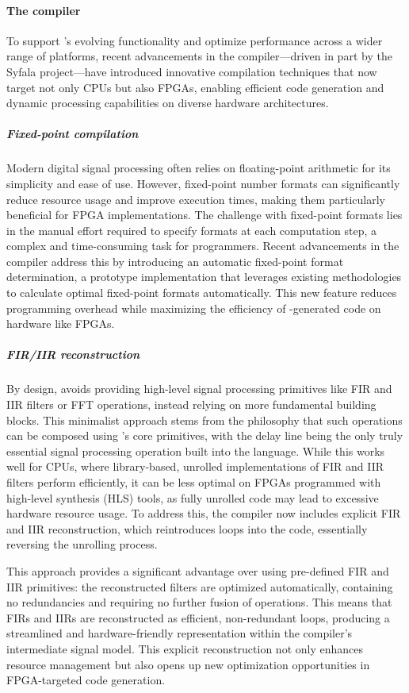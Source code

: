 \paragraph{The \F{} compiler}

To support \F{}'s evolving functionality and optimize performance
across a wider range of platforms, recent advancements in the \F{}
compiler---driven in part by the Syfala project---have introduced
innovative compilation techniques that now target not only CPUs but also
FPGAs, enabling efficient code generation and dynamic processing
capabilities on diverse hardware architectures.

\subparagraph{Fixed-point compilation}

Modern digital signal processing often relies on floating-point
arithmetic for its simplicity and ease of use. However, fixed-point
number formats can significantly reduce resource usage and improve
execution times, making them particularly beneficial for FPGA
implementations. The challenge with fixed-point formats lies in the
manual effort required to specify formats at each computation step, a
complex and time-consuming task for programmers. Recent advancements in
the \F{} compiler address this by introducing an automatic fixed-point
format determination, a prototype implementation that leverages existing
methodologies to calculate optimal fixed-point formats automatically.
This new feature reduces programming overhead while maximizing the
efficiency of \F{}-generated code on hardware like FPGAs.

\subparagraph{FIR/IIR reconstruction}

By design, \F{} avoids providing high-level signal processing
primitives like FIR and IIR filters or FFT operations, instead relying
on more fundamental building blocks. This minimalist approach stems from
the philosophy that such operations can be composed using \F{}'s core
primitives, with the delay line being the only truly essential signal
processing operation built into the language. While this works well for
CPUs, where library-based, unrolled implementations of FIR and IIR
filters perform efficiently, it can be less optimal on FPGAs programmed
with high-level synthesis (HLS) tools, as fully unrolled code may lead
to excessive hardware resource usage. To address this, the \F{}
compiler now includes explicit FIR and IIR reconstruction, which
reintroduces loops into the code, essentially reversing the unrolling
process.

This approach provides a significant advantage over using pre-defined
FIR and IIR primitives: the reconstructed filters are optimized
automatically, containing no redundancies and requiring no further
fusion of operations. This means that FIRs and IIRs are reconstructed as
efficient, non-redundant loops, producing a streamlined and
hardware-friendly representation within the compiler's intermediate
signal model. This explicit reconstruction not only enhances resource
management but also opens up new optimization opportunities in
FPGA-targeted code generation.

